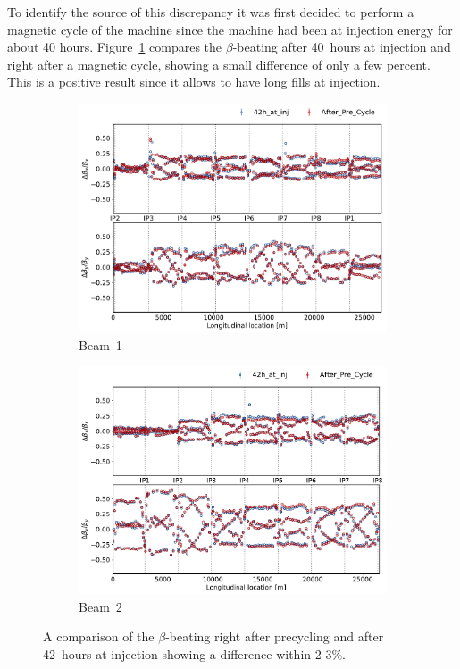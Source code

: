 \documentclass[a4paper]{cernatsnote}
\begin{document}
To identify the source of this discrepancy it was first decided to perform a magnetic cycle of the machine since the machine had been at injection energy for about 40 hours. Figure~\ref{fig:before_after_pre_cycle} compares the $\beta$-beating after 40~hours at injection and right after a magnetic cycle, showing a small difference of only a few percent. This is a positive result since it allows to have long fills at injection. 

\begin{figure}[ht]
\begin{subfigure}{.5\textwidth}
  \centering
  \includegraphics[width=.99\linewidth]{plots/beam1/beta_beat_before_after_pre_beam1.pdf}  
  \caption{Beam~1}
\end{subfigure}
\begin{subfigure}{.5\textwidth}
  \centering
  \includegraphics[width=.99\linewidth]{plots/beam2/beta_beat_before_after_pre_beam2.pdf}  
  \caption{Beam~2}
\end{subfigure}
\caption{A comparison of the $\beta$-beating right after precycling and after 42~hours at injection showing a difference within 2-3\%.}
\label{fig:before_after_pre_cycle}
\end{figure}
\end{document}
